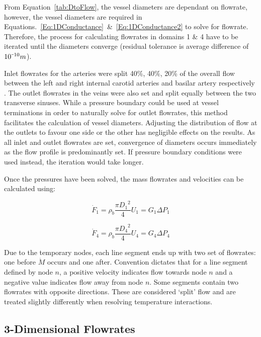 \documentclass[11pt,english,a4paper,twoside,openright]{report}
\newcommand{\smallminus}{\scalebox{0.5}[1.0]{$-$}}
\begin{document}
{{{{{{{{From Equation~\ref{tab:DtoFlow}, the vessel diameters are dependant on flowrate, however, the vessel diameters are required in Equations.~\ref{Eq:1DConductance}~\&~\ref{Eq:1DConductance2} to solve for flowrate. Therefore, the process for calculating flowrates in domains 1 \& 4 have to be iterated until the diameters converge (residual tolerance is average difference of $10^{\smallminus10}m$). 

Inlet flowrates for the arteries were split 40\%, 40\%, 20\% of the overall flow between the left and right internal carotid arteries and basilar artery respectively \cite{tanaka2006relationship}. The outlet flowrates in the veins were also set and split equally between the two transverse sinuses. While a pressure boundary could be used at vessel terminations in order to naturally solve for outlet flowrates, this method facilitates the calculation of vessel diameters. Adjusting the distribution of flow at the outlets to favour one side or the other has negligible effects on the results. As all inlet and outlet flowrates are set, convergence of diameters occurs immediately as the flow profile is predominantly set. If pressure boundary conditions were used instead, the iteration would take longer.   

Once the pressures have been solved, the mass flowrates and velocities can be calculated using:

\begin{equation}
\label{Eq:1DVelocities}
\dot{F}_{1}=\rho_{b}\frac{\pi {D_{1}}^{2}}{4}U_{1} = G_{1}\Delta P_{1}
\end{equation}

\begin{equation}
\label{Eq:1DVelocities2}
\dot{F}_{4}=\rho_{b}\frac{\pi {D_{4}}^{2}}{4}U_{4} = G_{4}\Delta P_{4}
\end{equation}

Due to the temporary nodes, each line segment ends up with two set of flowrates: one before $\dot{M}$ occurs and one after. Convention dictates that for a line segment defined by node $n$, a positive velocity indicates flow towards node $n$ and a negative value indicates flow away from node $n$. Some segments contain two flowrates with opposite directions. These are considered `split' flow and are treated slightly differently when resolving temperature interactions.

\subsection{3-Dimensional Flowrates}
\label{Sec:3Flowrates3d}

}}}}}}}}
\end{document}
